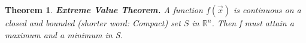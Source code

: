 \documentclass{article}
\newtheorem{thm}{Theorem}
\begin{document}
\begin{thm}
	\textbf{Extreme Value Theorem.} A function $f(\vec{x})$ is continuous on a closed and bounded (shorter word: Compact) set $S$ in $\mathbb{R}^n$. Then f must attain a maximum and a minimum in S. 
\end{thm}


 
\end{document}
